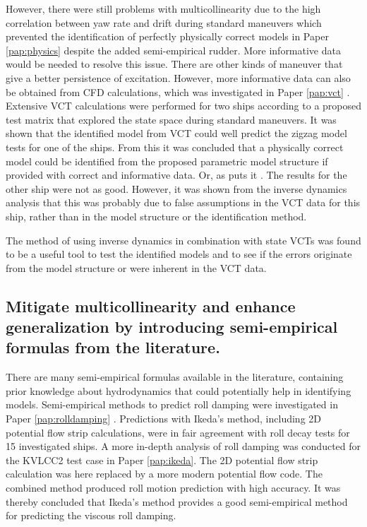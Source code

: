 However, there were still problems with multicollinearity due to the high correlation between yaw rate and drift during standard maneuvers which prevented the identification of perfectly physically correct models in Paper \ref{pap:physics} despite the added semi-empirical rudder. More informative data would be needed to resolve this issue. There are other kinds of maneuver that give a better persistence of excitation. However, more informative data can also be obtained from CFD calculations, which was investigated in Paper \ref{pap:vct} . Extensive VCT calculations were performed for two ships according to a proposed test matrix that explored the state space during standard maneuvers.
It was shown that the identified model from VCT could well predict the zigzag model tests for one of the ships. From this it was concluded that a physically correct model could be identified from the proposed parametric model structure if provided with correct and informative data. Or, as \textcite{revestidoherreroTwostepIdentificationNonlinear2012} puts it .
The results for the other ship were not as good.  However, it was shown from the inverse dynamics analysis that this was probably due to false assumptions in the VCT data for this ship, rather than in the model structure or the identification method.  

The method of using inverse dynamics in combination with state VCTs was found to be a useful tool to test the identified models and to see if the errors originate from the model structure or were inherent in the VCT data. 

\subsection*{Mitigate multicollinearity and enhance generalization by introducing semi-empirical formulas from the literature.}
There are many semi-empirical formulas available in the literature, containing prior knowledge about hydrodynamics that could potentially help in identifying models.       
Semi-empirical methods to predict roll damping were investigated in Paper \ref{pap:rolldamping} . Predictions with Ikeda's method, including 2D potential flow strip calculations, were in fair agreement with roll decay tests for 15 investigated ships. 
A more in-depth analysis of roll damping was conducted for the KVLCC2 test case in Paper \ref{pap:ikeda}. The 2D potential flow strip calculation was here replaced by a more modern potential flow code. The combined method produced roll motion prediction with high accuracy. It was thereby concluded that Ikeda's method provides a good semi-empirical method for predicting the viscous roll damping.

